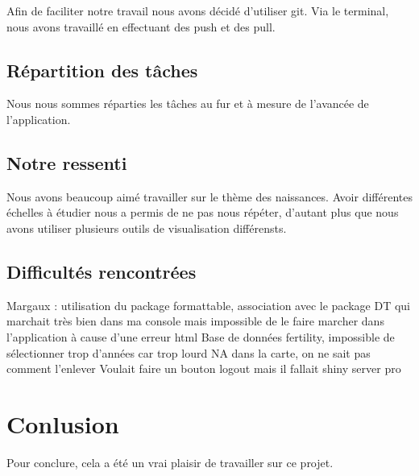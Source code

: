 \documentclass[
]{article}
\begin{document}
Afin de faciliter notre travail nous avons décidé d'utiliser git. Via le
terminal, nous avons travaillé en effectuant des push et des pull.

\hypertarget{ruxe9partition-des-tuxe2ches}{%
\subsection{Répartition des tâches}\label{ruxe9partition-des-tuxe2ches}}

Nous nous sommes réparties les tâches au fur et à mesure de l'avancée de
l'application.

\hypertarget{notre-ressenti}{%
\subsection{Notre ressenti}\label{notre-ressenti}}

Nous avons beaucoup aimé travailler sur le thème des naissances. Avoir
différentes échelles à étudier nous a permis de ne pas nous répéter,
d'autant plus que nous avons utiliser plusieurs outils de visualisation
différensts.

\hypertarget{difficultuxe9s-rencontruxe9es}{%
\subsection{Difficultés
rencontrées}\label{difficultuxe9s-rencontruxe9es}}

Margaux : utilisation du package formattable, association avec le
package DT qui marchait très bien dans ma console mais impossible de le
faire marcher dans l'application à cause d'une erreur html Base de
données fertility, impossible de sélectionner trop d'années car trop
lourd NA dans la carte, on ne sait pas comment l'enlever Voulait faire
un bouton logout mais il fallait shiny server pro

\hypertarget{conlusion}{%
\section{Conlusion}\label{conlusion}}

Pour conclure, cela a été un vrai plaisir de travailler sur ce projet.
\end{document}
